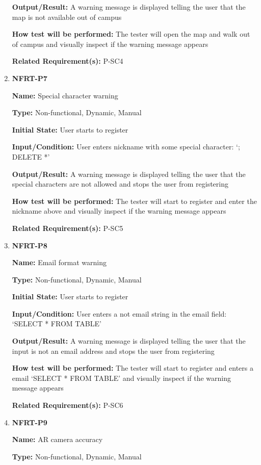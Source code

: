 \documentclass[12pt, titlepage]{article}
\begin{document}
\begin{enumerate}
\textbf{Output/Result:} A warning message is displayed telling the user that the map is not available out of campus

\textbf{How test will be performed:} The tester will open the map and walk out of campus and visually inspect if the warning message appears

\textbf{Related Requirement(s):} P-SC4

\item{\textbf{NFRT-P7}}

\textbf{Name:} Special character warning

\textbf{Type:} Non-functional, Dynamic, Manual
					
\textbf{Initial State:} User starts to register
					
\textbf{Input/Condition:} User enters nickname with some special character: `; DELETE *'
					
\textbf{Output/Result:} A warning message is displayed telling the user that the special characters are not allowed and stops the user from registering

\textbf{How test will be performed:} The tester will start to register and enter the nickname above and visually inspect if the warning message appears

\textbf{Related Requirement(s):} P-SC5

\item{\textbf{NFRT-P8}}

\textbf{Name:} Email format warning

\textbf{Type:} Non-functional, Dynamic, Manual
					
\textbf{Initial State:} User starts to register
					
\textbf{Input/Condition:} User enters a not email string in the email field:
`SELECT * FROM TABLE'
					
\textbf{Output/Result:} A warning message is displayed telling the user that the input is not an email address and stops the user from registering

\textbf{How test will be performed:} The tester will start to register and enters a email `SELECT * FROM TABLE' and visually inspect if the warning message appears

\textbf{Related Requirement(s):} P-SC6

\item{\textbf{NFRT-P9}}

\textbf{Name:} AR camera accuracy

\textbf{Type:} Non-functional, Dynamic, Manual
					

\end{enumerate}
\end{document}
